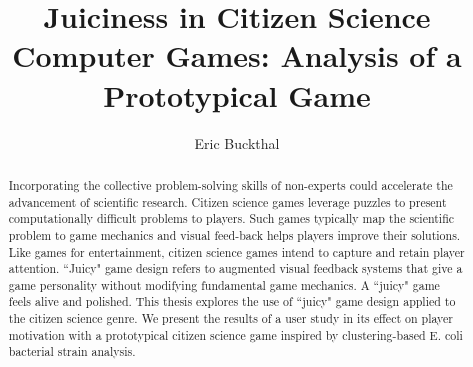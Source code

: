 \documentclass[12pt]{ucthesis}
\begin{document}

\title{Juiciness in Citizen Science Computer Games: Analysis of a Prototypical Game}
\author{Eric Buckthal}

  
 


 



\maketitle

\begin{frontmatter}

\copyrightpage

\committeemembershippage

\begin{abstract}

Incorporating the collective problem-solving skills of non-experts could accelerate the advancement of scientific research. Citizen science games leverage puzzles to present computationally difficult problems to players. Such games typically map the scientific problem to game mechanics and visual feed-back helps players improve their solutions. Like games for entertainment, citizen science games intend to capture and retain player attention. ``Juicy" game design refers to augmented visual feedback systems that give a game personality without modifying fundamental game mechanics. A ``juicy" game feels alive and polished. This thesis explores the use of ``juicy" game design applied to the citizen science genre. We present the results of a user study in its effect on player motivation with a prototypical citizen science game inspired by clustering-based E. coli bacterial strain analysis.

\end{abstract}



\tableofcontents

\listoftables

\listoffigures

\end{frontmatter}
\end{document}
